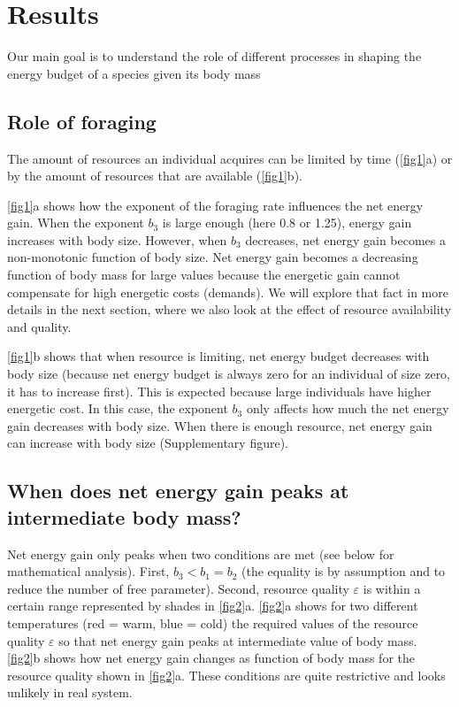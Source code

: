 \section*{Results}
Our main goal is to understand the role of different processes in shaping the energy budget of a species given its body mass


\subsection*{Role of foraging}
The amount of resources an individual acquires can be limited by time (\cref{fig1}a) or by the amount of resources that are available (\cref{fig1}b).

\cref{fig1}a shows how the exponent of the foraging rate influences the net energy gain.
When the exponent $b_3$ is large enough (here 0.8 or 1.25), energy gain increases with body size.
However, when $b_3$ decreases, net energy gain becomes a non-monotonic function of body size.
Net energy gain becomes a decreasing function of body mass for large values because the energetic gain cannot compensate for high energetic costs (demands).
We will explore that fact in more details in the next section, where we also look at the effect of resource availability and quality.     

\cref{fig1}b shows that when resource is limiting, net energy budget decreases with body size (because net energy budget is always zero for an individual of size zero, it has to increase first).
This is expected because large individuals have higher energetic cost.
In this case, the exponent $b_3$ only affects how much the net energy gain decreases with body size. 
When there is enough resource, net energy gain can increase with body size (Supplementary figure). 

\subsection*{When does net energy gain peaks at intermediate body mass?}
Net energy gain only peaks when two conditions  are met (see below for mathematical analysis).
First, $b_3 < b_1 = b_2$ (the equality is by assumption and to reduce the number of free parameter).
Second, resource quality $\varepsilon$ is within a certain range represented by shades in \cref{fig2}a.
\cref{fig2}a shows for two different temperatures (red = warm, blue = cold) the required values of the resource quality $\varepsilon$ so that net energy gain peaks at intermediate value of body mass.
\cref{fig2}b shows how net energy gain changes as function of body mass for the resource quality shown in \cref{fig2}a.
These conditions are quite restrictive and looks unlikely in real system.


